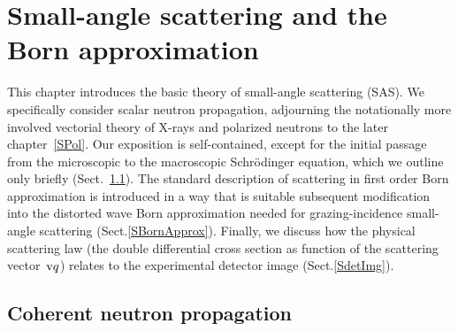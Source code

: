 
\chapter{Small-angle scattering and the Born approximation}  \label{SSas}

%

This chapter introduces the basic theory of small-angle scattering (SAS).
We specifically consider scalar neutron propagation,
adjourning the notationally more involved
vectorial theory of X-rays and polarized neutrons
to the later chapter~\ref{SPol}.
Our exposition is self-contained,
except for the initial passage from the microscopic
to the macroscopic Schrödinger equation,
which we outline only briefly (Sect.~\ref{Swave}).
The standard description of scattering in first order Born approximation
is introduced in a way that is suitable subsequent modification
into the distorted wave Born approximation
needed for grazing-incidence small-angle scattering (Sect.\ref{SBornApprox}).
Finally, we discuss how the physical scattering law
(the double differential cross section as function of the scattering vector~$\text{v}{q}$)
relates to the experimental detector image (Sect.\ref{SdetImg}).


\section{Coherent neutron propagation}\label{Swave}
%
%

